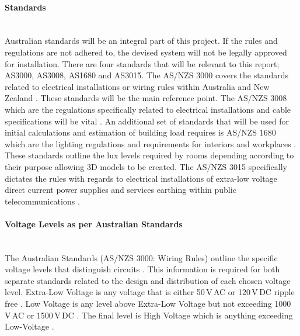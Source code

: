 \paragraph{Standards}
~\\
Australian standards will be an integral part of this project. If the rules and regulations are not adhered to, the devised system will not be legally approved for installation. There are four standards that will be relevant to this report; AS3000, AS3008, AS1680 and AS3015. The AS/NZS 3000 covers the standards related to electrical installations or wiring rules within Australia and New Zealand \cite{StandardsAustralia2007}. These standards will be the main reference point. The AS/NZS 3008 which are the regulations specifically related to electrical installations and cable specifications will be vital \cite{StandardsAustralia2010}. An additional set of standards that will be used for initial calculations and estimation of building load requires is AS/NZS 1680 which are the lighting regulations and requirements for interiors and workplaces \cite{StandardsAustralia2006_2}. These standards outline the lux levels required by rooms depending according to their purpose allowing 3D models to be created. The AS/NZS 3015 specifically dictates the rules with regards to electrical installations of extra-low voltage direct current power supplies and services earthing within public telecommunications \cite{StandardsAustralia2004}.

\paragraph{Voltage Levels as per Australian Standards}
~\\
The Australian Standards (AS/NZS 3000: Wiring Rules) outline the specific voltage levels that distinguish circuits \cite{StandardsAustralia2007}. This information is required for both separate standards related to the design and distribution of each chosen voltage level. Extra-Low Voltage is any voltage that is either 50\,V\,AC or 120\,V\,DC ripple free \cite{StandardsAustralia2007}. Low Voltage is any level above Extra-Low Voltage but not exceeding 1000\,V\,AC or 1500\,V\,DC \cite{StandardsAustralia2007}. The final level is High Voltage which is anything exceeding Low-Voltage \cite{StandardsAustralia2007}.  

